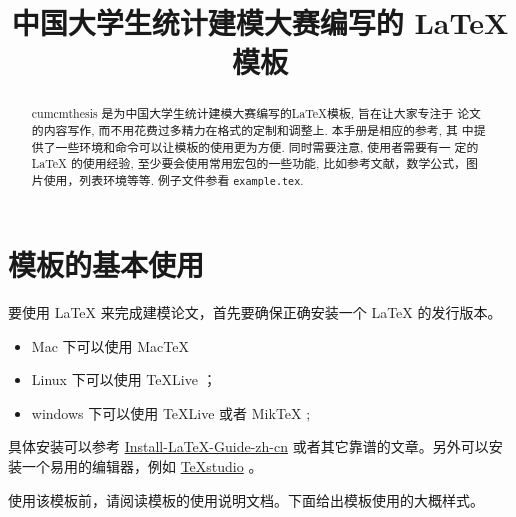 \documentclass[withoutpreface,bwprint]{cumcmthesis} %
\title{中国大学生统计建模大赛编写的 \LaTeX{} 模板}
\begin{document}
 \maketitle
 \begin{abstract}
cumcmthesis 是为中国大学生统计建模大赛编写的\LaTeX{}模板, 旨在让大家专注于 论文的内容写作, 而不用花费过多精力在格式的定制和调整上. 本手册是相应的参考, 其 中提供了一些环境和命令可以让模板的使用更为方便. 同时需要注意, 使用者需要有一 定的 \LaTeX{} 的使用经验, 至少要会使用常用宏包的一些功能, 比如参考文献，数学公式，图片使用，列表环境等等. 例子文件参看 \texttt{example.tex}.



\end{abstract}

\tableofcontents

\newpage

\section{模板的基本使用}

要使用 \LaTeX{} 来完成建模论文，首先要确保正确安装一个 \LaTeX{} 的发行版本。

\begin{itemize}
    \item Mac 下可以使用 Mac\TeX{}
    \item Linux 下可以使用 \TeX{}Live ；
    \item windows 下可以使用 \TeX{}Live 或者 Mik\TeX{} ;
\end{itemize}

具体安装可以参考 \href{https://github.com/OsbertWang/install-latex-guide-zh-cn/releases/}{Install-LaTeX-Guide-zh-cn} 或者其它靠谱的文章。另外可以安装一个易用的编辑器，例如 \href{https://mirrors.tuna.tsinghua.edu.cn/github-release/texstudio-org/texstudio/LatestRelease/}{\TeX{}studio} 。

使用该模板前，请阅读模板的使用说明文档。下面给出模板使用的大概样式。
\end{document}
